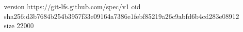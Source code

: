 version https://git-lfs.github.com/spec/v1
oid sha256:d3b7684b254b3957f33e09164a7386e1febf85219a26c9abfd6b4cd283e08912
size 22000
